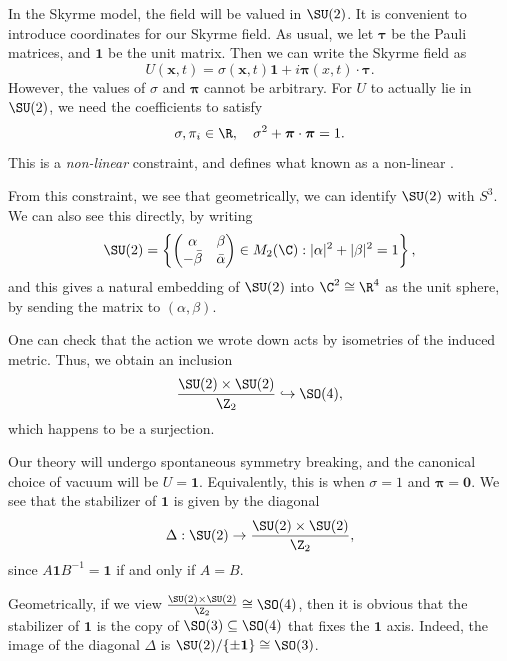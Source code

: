 \documentclass[a4paper]{article}
\begin{document}
In the Skyrme model, the field will be valued in $\SU(2)$. It is convenient to introduce coordinates for our Skyrme field. As usual, we let $\boldsymbol\tau$ be the Pauli matrices, and $\mathbf{1}$ be the unit matrix. Then we can write the Skyrme field as
\[
  U(\mathbf{x}, t) = \sigma(\mathbf{x}, t) \mathbf{1} + i \boldsymbol\pi(x, t) \cdot \boldsymbol\tau.
\]
However, the values of $\sigma$ and $\boldsymbol\pi$ cannot be arbitrary. For $U$ to actually lie in $\SU(2)$, we need the coefficients to satisfy
\[
  \sigma, \pi_i \in \R,\quad \sigma^2 + \boldsymbol\pi \cdot \boldsymbol\pi = 1.
\]
This is a \emph{non-linear} constraint, and defines what known as a non-linear .

From this constraint, we see that geometrically, we can identify $\SU(2)$ with $S^3$. We can also see this directly, by writing
\[
  \SU(2) =\left\{
  \begin{pmatrix}
    \alpha & \beta\\
    -\bar{\beta} & \bar{\alpha}
  \end{pmatrix} \in M_2(\C): |\alpha|^2 + |\beta|^2 = 1\right\},
\]
and this gives a natural embedding of $\SU(2)$ into $\C^2 \cong \R^4$ as the unit sphere, by sending the matrix to $(\alpha, \beta)$.

One can check that the action we wrote down acts by isometries of the induced metric. Thus, we obtain an inclusion
\[
  \frac{\SU(2) \times \SU(2)}{\Z_2} \hookrightarrow \SO(4),
\]
which happens to be a surjection.

Our theory will undergo spontaneous symmetry breaking, and the canonical choice of vacuum will be $U = \mathbf{1}$. Equivalently, this is when $\sigma = 1$ and $\boldsymbol\pi = \mathbf{0}$. We see that the stabilizer of $\mathbf{1}$ is given by the diagonal
\[
  \Delta : \SU(2) \rightarrow \frac{\SU(2) \times \SU(2)}{\Z_2},
\]
since $A\mathbf{1}B^{-1} = \mathbf{1}$ if and only if $A = B$.

Geometrically, if we view $\frac{\SU(2) \times \SU(2)}{\Z_2} \cong \SO(4)$, then it is obvious that the stabilizer of $\mathbf{1}$ is the copy of $\SO(3) \subseteq \SO(4)$ that fixes the $\mathbf{1}$ axis. Indeed, the image of the diagonal $\Delta$ is $\SU(2)/\{\pm \mathbf{1}\} \cong \SO(3)$.
\end{document}
